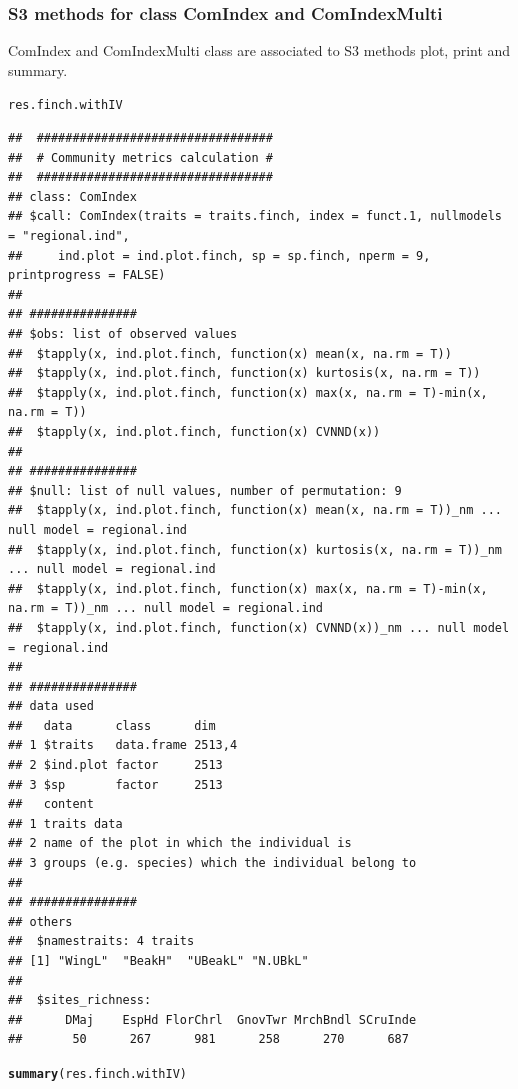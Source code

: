 \documentclass[12pt]{article}\usepackage[]{graphicx}\usepackage[]{color}
\makeatletter
\newcommand{\hlstd}[1]{\textcolor[rgb]{0.345,0.345,0.345}{#1}}%
\newcommand{\hlkwd}[1]{\textcolor[rgb]{0.737,0.353,0.396}{\textbf{#1}}}%
\newenvironment{kframe}{%
 \def\at@end@of@kframe{}%
 \ifinner\ifhmode%
  \def\at@end@of@kframe{\end{minipage}}%
  \begin{minipage}{\columnwidth}%
 \fi\fi%
 \def\FrameCommand##1{\hskip\@totalleftmargin \hskip-\fboxsep
 \colorbox{shadecolor}{##1}\hskip-\fboxsep
     \hskip-\linewidth \hskip-\@totalleftmargin \hskip\columnwidth}%
 \MakeFramed {\advance\hsize-\width
   \@totalleftmargin\z@ \linewidth\hsize
   \@setminipage}}%
 {\par\unskip\endMakeFramed%
 \at@end@of@kframe}
\newenvironment{knitrout}{}{} %
\makeatother
\begin{document}
\subsubsection{S3 methods for class ComIndex and ComIndexMulti}
ComIndex and ComIndexMulti class are associated to S3 methods plot, print and summary.

\begin{knitrout}
\color{fgcolor}\begin{kframe}
\begin{alltt}
\hlstd{res.finch.withIV}
\end{alltt}
\begin{verbatim}
## 	#################################
## 	# Community metrics calculation #
## 	#################################
## class: ComIndex
## $call: ComIndex(traits = traits.finch, index = funct.1, nullmodels = "regional.ind", 
##     ind.plot = ind.plot.finch, sp = sp.finch, nperm = 9, printprogress = FALSE)
## 
## ###############
## $obs: list of observed values
## 	$tapply(x, ind.plot.finch, function(x) mean(x, na.rm = T))
## 	$tapply(x, ind.plot.finch, function(x) kurtosis(x, na.rm = T))
## 	$tapply(x, ind.plot.finch, function(x) max(x, na.rm = T)-min(x, na.rm = T))
## 	$tapply(x, ind.plot.finch, function(x) CVNND(x))
## 
## ###############
## $null: list of null values, number of permutation: 9 
## 	$tapply(x, ind.plot.finch, function(x) mean(x, na.rm = T))_nm ... null model = regional.ind
## 	$tapply(x, ind.plot.finch, function(x) kurtosis(x, na.rm = T))_nm ... null model = regional.ind
## 	$tapply(x, ind.plot.finch, function(x) max(x, na.rm = T)-min(x, na.rm = T))_nm ... null model = regional.ind
## 	$tapply(x, ind.plot.finch, function(x) CVNND(x))_nm ... null model = regional.ind
## 
## ###############
## data used
##   data      class      dim   
## 1 $traits   data.frame 2513,4
## 2 $ind.plot factor     2513  
## 3 $sp       factor     2513  
##   content                                             
## 1 traits data                                         
## 2 name of the plot in which the individual is         
## 3 groups (e.g. species) which the individual belong to
## 
## ###############
## others
## 	$namestraits: 4 traits
## [1] "WingL"  "BeakH"  "UBeakL" "N.UBkL"
## 
## 	$sites_richness:
## 	    DMaj    EspHd FlorChrl  GnovTwr MrchBndl SCruInde 
##       50      267      981      258      270      687
\end{verbatim}
\begin{alltt}
\hlkwd{summary}\hlstd{(res.finch.withIV)}

\end{alltt}
\end{kframe}
\end{knitrout}
\end{document}
